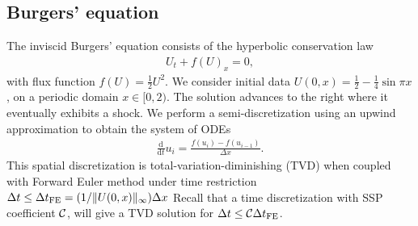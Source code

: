 \subsection{Burgers' equation}\label{subsubsec:burgers}
The inviscid Burgers' equation consists of the hyperbolic conservation law
\begin{align}\label{eq:HCL}
    U_{t} + f(U)_{x} = 0,
\end{align}
with flux function $f(U) = \frac{1}{2}U^{2}$. 
We consider initial data
$U(0,x)  = \frac{1}{2} - \frac{1}{4}\sin{\pi x}$,
on a periodic domain $x \in [0,2)$.
The solution advances to the right where it eventually exhibits a shock. 
We perform a semi-discretization
using an upwind approximation to obtain the system of ODEs
\begin{align*}\label{eq:burgers_flux}
	\frac{\textrm{d}}{\textrm{d} t} u_i = \frac{f(u_{i}) - f(u_{i-1})}{\Delta x}.
\end{align*}
This spatial discretization is total-variation-diminishing (TVD) when
coupled with Forward Euler method under time restriction
$\Delta t \leq {\Delta t}_{\text{FE}} = (1 / \|U(0,x)\|_{\infty}) \Delta x$
\cite{Laney:1998} %
Recall that a time discretization with SSP
coefficient $\mathcal{C}$, will give a TVD solution for $\Delta t \leq
\mathcal{C} {\Delta t}_{\text{FE}}$.

